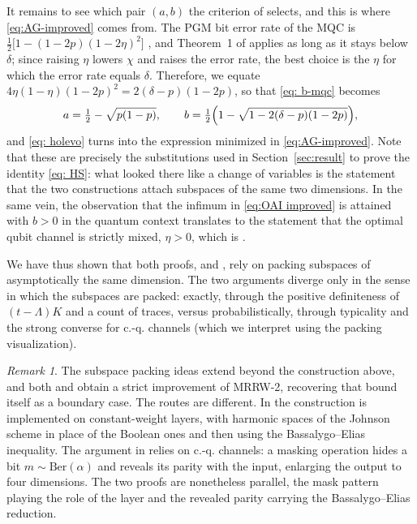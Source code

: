 \documentclass[11pt]{amsart}
\theoremstyle{plain}
\theoremstyle{remark}
\newtheorem{remark}[theorem]{Remark}
\begin{document}
It remains to see which pair $(a,b)$ the criterion of \cite{AG26} selects, and
this is where \eqref{eq:AG-improved} comes from. The PGM bit error rate of the
MQC is $\frac12\bigl[1-(1-2p)(1-2\eta)^{2}\bigr]$ \cite[Eq.~(34)]{AG26}, and
Theorem~1 of \cite{AG26} applies as long as it stays below $\delta$; since
raising $\eta$ lowers $\chi$ and raises the error rate, the best choice is the
$\eta$ for which the error rate equals $\delta$. Therefore, we equate 
$4\eta(1-\eta)(1-2p)^{2}=2(\delta-p)(1-2p)$, so that \eqref{eq: b-mqc} becomes
\[
 a=\tfrac12-\sqrt{p(1-p)},
 \qquad
 b=\tfrac12\Bigl(1-\sqrt{1-2(\delta-p)(1-2p)}\Bigr),
\]
and \eqref{eq: holevo} turns into the expression minimized in
\eqref{eq:AG-improved}. Note that these are precisely the substitutions used in
Section~\ref{sec:result} to prove the identity \eqref{eq: HS}: what looked
there like a change of variables is the statement that the two constructions
attach subspaces of the same two dimensions. In the same vein, the observation
that the infimum in \eqref{eq:OAI improved} is attained with $b>0$ in the quantum context translates
to the statement that the optimal qubit channel is strictly mixed,
$\eta>0$, which is \cite[Prop.~25]{AG26}.

We have thus shown that both proofs, \cite{OAI26} and \cite{AG26}, rely on packing subspaces of asymptotically the same dimension. The two arguments diverge only in the sense in which the subspaces are packed: exactly, through the positive definiteness of $(t-\Lambda)K$ and a count of traces, versus probabilistically, through typicality and the strong converse for c.-q. channels (which we interpret using the packing visualization).

\begin{remark}
The subspace packing ideas extend beyond the construction above, and both
\cite{OAI26} and \cite{AG26} obtain a strict improvement of MRRW-2, recovering
that bound itself as a boundary case. The routes are different. In
\cite{OAI26} the construction is implemented on constant-weight layers, with
harmonic spaces of the Johnson scheme in place of the Boolean ones and then
using the Bassalygo--Elias inequality. The argument in 
\cite{AG26} relies on c.-q. channels: a masking operation hides a bit
$m\sim\mathrm{Ber}(\alpha)$ and reveals its parity with the input, enlarging the
output to four dimensions. The two proofs are nonetheless parallel, the mask pattern playing the role of the layer and the revealed parity carrying the
Bassalygo--Elias reduction.
\end{remark}
\end{document}

